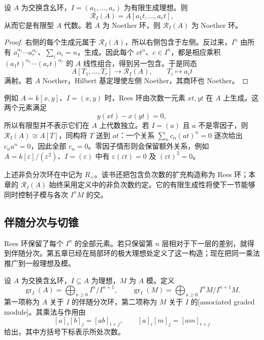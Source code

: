 \begin{proposition}\label{g5:prop:rees-noetherian}
	设 \(A\) 为交换含幺环，\(I=(a_1,\ldots,a_r)\) 为有限生成理想。则
	\[
		\mathcal R_I(A)=A[a_1t,\ldots,a_rt],
	\]
	从而它是有限型 \(A\) 代数。若 \(A\) 为 Noether 环，则 \(\mathcal R_I(A)\) 为 Noether 环。
\end{proposition}
\begin{proof}
	右侧的每个生成元属于 \(\mathcal R_I(A)\)，所以右侧包含于左侧。反过来，\(I^n\) 由所有
	\(a_1^{\alpha_1}\cdots a_r^{\alpha_r}\)、\(\sum_i\alpha_i=n\)，生成。因此每个 \(ct^n\)、\(c\in I^n\)，都是相应乘积
	\((a_1t)^{\alpha_1}\cdots(a_rt)^{\alpha_r}\)
	的 \(A\) 线性组合，得到另一包含。于是同态
	\[
		A[T_1,\ldots,T_r]\longrightarrow\mathcal R_I(A),
		\qquad T_i\longmapsto a_it
	\]
	满射。若 \(A\) Noether，Hilbert 基定理使左侧 Noether，其商环也 Noether。
\end{proof}

例如 \(A=k[x,y]\)、\(I=(x,y)\) 时，Rees 环由次数一元素 \(xt,yt\) 在 \(A\) 上生成。这两个元素满足
\[
	y(xt)-x(yt)=0,
\]
所以有限型并不表示它们在 \(A\) 上代数独立。若 \(I=(a)\) 且 \(a\) 不是零因子，则 \(\mathcal R_I(A)\cong A[T]\)，同构将 \(T\) 送到 \(at\)：一个关系
\(\sum_nc_n(at)^n=0\) 逐次给出 \(c_na^n=0\)，因此全部 \(c_n=0\)。零因子情形则会保留额外关系，例如 \(A=k[\varepsilon]/(\varepsilon^2)\)、\(I=(\varepsilon)\) 中有 \(\varepsilon(\varepsilon t)=0\) 及 \((\varepsilon t)^2=0\)。

\ProseParagraphBreak

上述非负分次环在\cite[第15节，第4部分，第120页]{Matsumura1989}中记为 \(R_+\)。该书还把包含负次数的扩充构造称为 Rees 环；本章的 \(\mathcal R_I(A)\) 始终采用定义中的非负次数约定。它的有限生成性将使下一节能够同时控制子模与各次 \(I^nM\) 的交。

\subsection{伴随分次与切锥}
\label{g5:subsec:0701:03}

Rees 环保留了每个 \(I^n\) 的全部元素。若只保留第 \(n\) 层相对于下一层的差别，就得到伴随分次。第五章已经在局部环的极大理想处定义了这一构造；现在把同一乘法推广到一般理想及模。

\begin{definition}\label{g5:def:ideal-associated-graded}
	设 \(A\) 为交换含幺环，\(I\subseteq A\) 为理想，\(M\) 为 \(A\) 模。定义
	\[
		\operatorname{gr}_I(A)=\bigoplus_{n\geq0}I^n/I^{n+1},
		\qquad
		\operatorname{gr}_I(M)=\bigoplus_{n\geq0}I^nM/I^{n+1}M.
	\]
	第一项称为 \(A\) 关于 \(I\) 的伴随分次环，第二项称为 \(M\) 关于 \(I\) 的[associated graded module]。其乘法与作用由
	\[
		[a]_i[b]_j=[ab]_{i+j},\qquad
		[a]_i[m]_j=[am]_{i+j}
	\]
	给出，其中方括号下标表示所处次数。
\end{definition}

